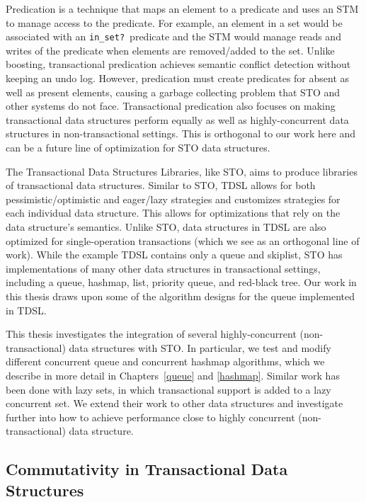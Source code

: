 Predication\cite{predication} is a technique that maps an element to a predicate and uses an STM to manage access to the predicate. For example, an element in a set would be associated with an \texttt{in\_set?}\ predicate and the STM would manage reads and writes of the predicate when elements are removed/added to the set. Unlike boosting, transactional predication achieves semantic conflict detection without keeping an undo log. However, predication must create predicates for absent as well as present elements, causing a garbage collecting problem that STO and other systems do not face. Transactional predication also focuses on making transactional data structures perform equally as well as highly-concurrent data structures in non-transactional settings. This is orthogonal to our work here and can be a future line of optimization for STO data structures.

The Transactional Data Structures Libraries\cite{tdsl}, like STO, aims to produce libraries of transactional data structures. Similar to STO, TDSL allows for both pessimistic/optimistic and eager/lazy strategies and customizes strategies for each individual data structure. This allows for optimizations that rely on the data structure's semantics. Unlike STO, data structures in TDSL are also optimized for single-operation transactions (which we see as an orthogonal line of work). While the example TDSL contains only a queue and skiplist, STO has implementations of many other data structures in transactional settings, including a queue, hashmap, list, priority queue, and red-black tree. Our work in this thesis draws upon some of the algorithm designs for the queue implemented in TDSL.

This thesis investigates the integration of several highly-concurrent (non-transactional) data structures with STO. In particular, we test and modify different concurrent queue \cite{queue1}\cite{queue2}\cite{queue3}\cite{queue4}\cite{queue5}\cite{flatcombining} and concurrent hashmap\cite{hm1}\cite{hm2}\cite{hm3}\cite{chm} algorithms, which we describe in more detail in Chapters~\ref{queue} and \ref{hashmap}. Similar work has been done with lazy sets\cite{lazyset}, in which transactional support is added to a lazy concurrent set. We extend their work to other data structures and investigate further into how to achieve performance close to highly concurrent (non-transactional) data structure.

\subsection{Commutativity in Transactional Data Structures}

